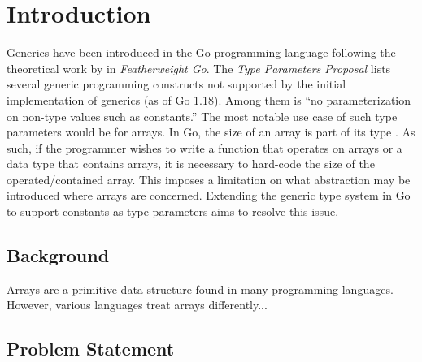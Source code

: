 \section{Introduction}

Generics have been introduced in the Go programming language following the
theoretical work by \cite{fg} in \emph{Featherweight Go}. The \emph{Type
Parameters Proposal} lists several generic programming constructs not supported
by the initial implementation of generics (as of Go 1.18). Among them is ``no
parameterization on non-type values such as constants.''
\autocite{genericsProposal} The most notable use case of such type parameters
would be for arrays. In Go, the size of an array is part of its type
\autocite{spec}. As such, if the programmer wishes to write a function that
operates on arrays or a data type that contains arrays, it is necessary to
hard-code the size of the operated/contained array. This imposes a limitation on
what abstraction may be introduced where arrays are concerned. Extending the
generic type system in Go to support constants as type parameters aims to
resolve this issue.

\subsection{Background}

Arrays are a primitive data structure found in many programming languages.
However, various languages treat arrays differently...



\subsection{Problem Statement}

